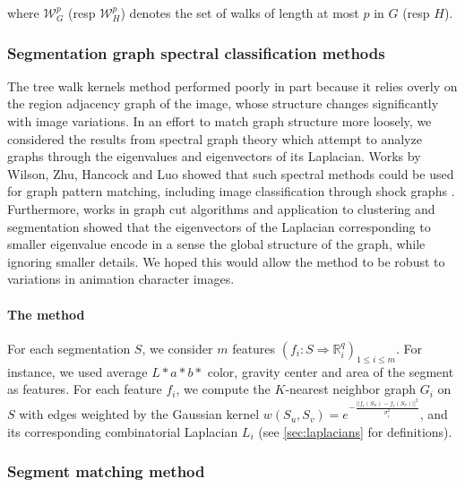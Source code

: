 where $\mathcal{W}_G^p$ (resp $\mathcal{W}_H^p$) denotes the set of walks of length at most $p$ in $G$ (resp $H$).

\subsubsection{Segmentation graph spectral classification methods}
The tree walk kernels method performed poorly in part because it relies overly on the region adjacency graph of the image, whose structure changes significantly with image variations. In an effort to match graph structure more loosely, we considered the results from spectral graph theory which attempt to analyze graphs through the eigenvalues and eigenvectors of its Laplacian. Works by Wilson, Zhu, Hancock and Luo showed that such spectral methods could be used for graph pattern matching, including image classification through shock graphs \cite{wilson2005pattern}\cite{wilson2008study}. Furthermore, works in graph cut algorithms and application to clustering \cite{ng2002spectral} and segmentation\cite{shi2000normalized}\cite{meila2001random} showed that the eigenvectors of the Laplacian corresponding to smaller eigenvalue encode in a sense the global structure of the graph, while ignoring smaller details. We hoped this would allow the method to be robust to variations in animation character images.

\paragraph{The method} For each segmentation $S$, we consider $m$ features $(f_i : S \Rightarrow \mathbb{R}_i^q)_{1 \leq i \leq m}$. For instance, we used average $L*a*b*$ color, gravity center and area of the segment as features. For each feature $f_i$, we compute the $K$-nearest neighbor graph $G_i$ on $S$ with edges weighted by the Gaussian kernel $w(S_u,S_v) = e^{-\frac{||f_i(S_u) - f_i(S_v)||^2}{\sigma_i^2}}$, and its corresponding combinatorial Laplacian  $L_i$ (see \autoref{sec:laplacians} for definitions).




\subsubsection{Segment matching method}
